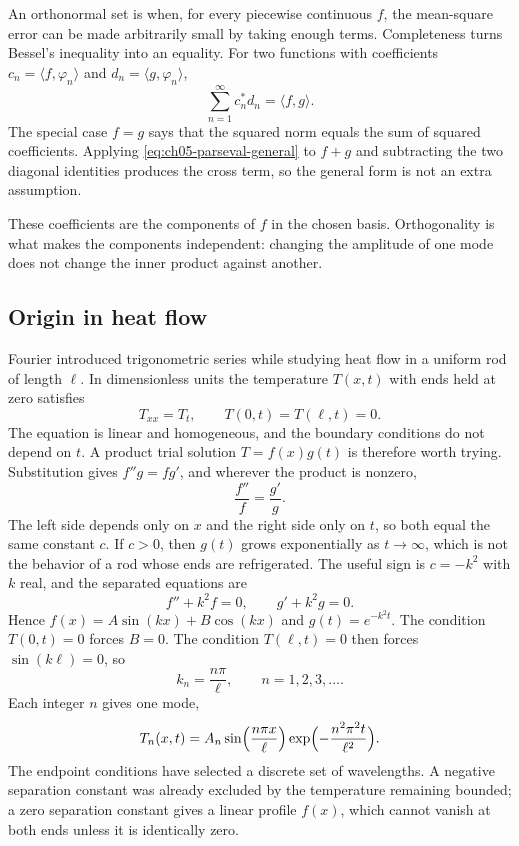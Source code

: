 An orthonormal set is  when, for every piecewise continuous $f$, the mean-square error can be made arbitrarily small by taking enough terms. Completeness turns Bessel's inequality into an equality. For two functions with coefficients $c_n=\langle f,\varphi_n\rangle$ and $d_n=\langle g,\varphi_n\rangle$,
\begin{equation}
\sum_{n=1}^{\infty}c_n^*d_n=\langle f,g\rangle.
\label{eq:ch05-parseval-general}
\end{equation}
The special case $f=g$ says that the squared norm equals the sum of squared coefficients. Applying \eqref{eq:ch05-parseval-general} to $f+g$ and subtracting the two diagonal identities produces the cross term, so the general form is not an extra assumption.

These coefficients are the components of $f$ in the chosen basis. Orthogonality is what makes the components independent: changing the amplitude of one mode does not change the inner product against another.

\subsection{Origin in heat flow}

Fourier introduced trigonometric series while studying heat flow in a uniform rod of length $\ell$. In dimensionless units the temperature $T(x,t)$ with ends held at zero satisfies
\begin{equation}
T_{xx}=T_t,
\qquad T(0,t)=T(\ell,t)=0.
\label{eq:ch05-heat-rod}
\end{equation}
The equation is linear and homogeneous, and the boundary conditions do not depend on $t$. A product trial solution $T=f(x)g(t)$ is therefore worth trying. Substitution gives $f''g=fg'$, and wherever the product is nonzero,
\begin{equation}
\frac{f''}{f}=\frac{g'}{g}.
\end{equation}
The left side depends only on $x$ and the right side only on $t$, so both equal the same constant $c$. If $c>0$, then $g(t)$ grows exponentially as $t\to\infty$, which is not the behavior of a rod whose ends are refrigerated. The useful sign is $c=-k^2$ with $k$ real, and the separated equations are
\begin{equation}
f''+k^2f=0,
\qquad g'+k^2g=0.
\end{equation}
Hence $f(x)=A\sin(kx)+B\cos(kx)$ and $g(t)=e^{-k^2t}$. The condition $T(0,t)=0$ forces $B=0$. The condition $T(\ell,t)=0$ then forces $\sin(k\ell)=0$, so
\begin{equation}
k_n=\frac{n\pi}{\ell},
\qquad n=1,2,3,\ldots.
\end{equation}
Each integer $n$ gives one mode,
\begin{equation}
T_n(x,t)=A_n\sin\Bigl(\frac{n\pi x}{\ell}\Bigr)
\exp\Bigl(-\frac{n^2\pi^2 t}{\ell^2}\Bigr).
\label{eq:ch05-heat-mode}
\end{equation}
The endpoint conditions have selected a discrete set of wavelengths. A negative separation constant was already excluded by the temperature remaining bounded; a zero separation constant gives a linear profile $f(x)$, which cannot vanish at both ends unless it is identically zero.


